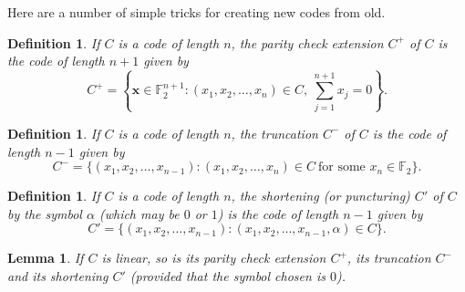 \documentclass[12pt,a4paper]{article}
\theoremstyle{plain}
\newtheorem{lemma}[theorem]{Lemma}
\newtheorem{definition}[theorem]{Definition}
\theoremstyle{definition}
\begin{document}
Here are a number of simple tricks for creating new
codes from old.
\begin{definition} If $C$ is a code of
length $n$, the \emph{parity check extension}
$C^{+}$ of $C$ is the code of length $n+1$ given by
\[C^{+}=\left\{{\mathbf x}\in{\mathbb F}_{2}^{n+1}:
(x_{1},x_{2},\dots,x_{n})\in C,\ \sum_{j=1}^{n+1}x_{j}=0
\right\}.\]
\end{definition}
\begin{definition} If $C$ is a code of
length $n$, the \emph{truncation}
$C^{-}$ of $C$ is the code of length $n-1$ given by
\[C^{-}=\{(x_{1},x_{2},\dots,x_{n-1}):
(x_{1},x_{2},\dots,x_{n})\in C
\ \text{for some $x_{n}\in{\mathbb F}_{2}$}\}.\]
\end{definition}
\begin{definition} If $C$ is a code of
length $n$, the \emph{shortening} (or \emph{puncturing})
$C'$ of $C$ by the symbol $\alpha$ (which may be $0$
or $1$)
is the code of length $n-1$ given by
\[C'=\{(x_{1},x_{2},\dots,x_{n-1}):
(x_{1},x_{2},\dots,x_{n-1},\alpha)\in C\}.\]
\end{definition}
\begin{lemma} If $C$ is linear, so is its
parity check extension $C^{+}$, its
truncation $C^{-}$ and its shortening $C'$ (provided
that the symbol chosen is $0$).
\end{lemma}
\end{document}
